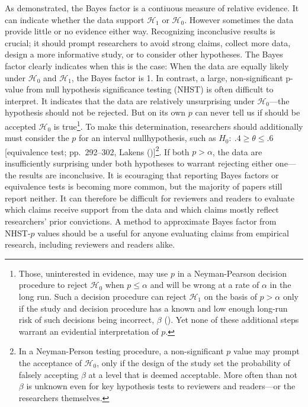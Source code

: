 \documentclass[
  man,
  floatsintext,
  longtable,
  nolmodern,
  notxfonts,
  notimes,
  colorlinks=true,linkcolor=blue,citecolor=blue,urlcolor=blue]{apa7}
\begin{document}
As demonstrated, the Bayes factor is a contiuous measure of relative
evidence. It can indicate whether the data support \(\mathcal{H}_1\) or
\(\mathcal{H}_0\). However sometimes the data provide little or no
evidence either way. Recognizing inconclusive results is crucial; it
should prompt researchers to avoid strong claims, collect more data,
design a more informative study, or to consider other hypotheses. The
Bayes factor clearly indicates when this is the case: When the data are
equally likely under \(\mathcal{H}_0\) and \(\mathcal{H}_1\), the Bayes
factor is 1. In contrast, a large, non-significant p-value from null
hypothesis significance testing (NHST) is often difficult to interpret.
It indicates that the data are relatively unsurprising under
\(\mathcal{H}_0\)---the hypothesis should not be rejected. But on its
own \(p\) can never tell us if should be accepted \(\mathcal{H}_0\) is
true\footnote{Those, uninterested in evidence, may use \(p\) in a
  Neyman-Pearson decision procedure to reject \(\mathcal{H}_0\) when
  \(p \leq \alpha\) and will be wrong at a rate of \(\alpha\) in the
  long run. Such a decision procedure can reject \(\mathcal{H}_1\) on
  the basis of \(p > \alpha\) only if the study and decision procedure
  has a known and low enough long-run risk of such decisions being
  incorrect, \(\beta\) ().
  Yet none of these additional steps warrant an evidential
  interpretation of \(p\).}. To make this determination, researchers
should additionally must consider the \(p\) for an interval
nullhypothesis, such as \(H_0:~.4 \geq \theta \leq .6\) {[}equivalence
test; pp.~292--302, Lakens
(){]}\footnote{In a Neyman-Person testing
  procedure, a non-significant \(p\) value may prompt the acceptance of
  \(\mathcal{H}_0\), only if the design of the study set the probability
  of falsely accepting \(\beta\) at a level that is deemed acceptable.
  More often than not \(\beta\) is unknown even for key hypothesis tests
  to reviewers and readers---or the researchers themselves.}. If both
\(p > \alpha\), the data are insufficiently surprising under both
hypotheses to warrant rejecting either one---the results are
inconclusive. It is ecouraging that reporting Bayes factors or
equivalence tests is becoming more common, but the majority of papers
still report neither. It can therefore be difficult for reviewers and
readers to evaluate which claims receive support from the data and which
claims mostly reflect researchers' prior convictions. A method to
approximate Bayes factor from NHST-\(p\) values should be a useful for
anyone evaluating claims from empirical research, including reviewers
and readers alike.
\end{document}
